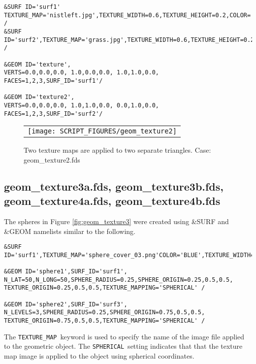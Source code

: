 \documentclass[12pt]{article}
\begin{document}
{\scriptsize
\begin{verbatim}
&SURF ID='surf1' TEXTURE_MAP='nistleft.jpg',TEXTURE_WIDTH=0.6,TEXTURE_HEIGHT=0.2,COLOR='BLUE' /
&SURF ID='surf2',TEXTURE_MAP='grass.jpg',TEXTURE_WIDTH=0.6,TEXTURE_HEIGHT=0.2,COLOR='GREEN' /

&GEOM ID='texture',
VERTS=0.0,0.0,0.0, 1.0,0.0,0.0, 1.0,1.0,0.0,
FACES=1,2,3,SURF_ID='surf1'/

&GEOM ID='texture2',
VERTS=0.0,0.0,0.0, 1.0,1.0,0.0, 0.0,1.0,0.0,
FACES=1,2,3,SURF_ID='surf2'/
\end{verbatim}
}

\begin{figure}[\figoptions]
\begin{center}
\begin{tabular}{c}
 \texttt{[image: SCRIPT\_FIGURES/geom\_texture2]}
  \end{tabular}
\end{center}
 \caption{Two texture maps are applied to two separate triangles.  Case: geom\_texture2.fds}
\label{fig:geom_texture2}
\end{figure}

\subsection{geom\_texture3a.fds, geom\_texture3b.fds, geom\_texture4a.fds, geom\_texture4b.fds}
The spheres in Figure \ref{fig:geom_texture3} were created using \&SURF and \&GEOM namelists similar to the following.

{\scriptsize
\begin{verbatim}
&SURF ID='surf1',TEXTURE_MAP='sphere_cover_03.png'COLOR='BLUE',TEXTURE_WIDTH=1.0,TEXTURE_HEIGHT=1.0/

&GEOM ID='sphere1',SURF_ID='surf1',
N_LAT=50,N_LONG=50,SPHERE_RADIUS=0.25,SPHERE_ORIGIN=0.25,0.5,0.5,
TEXTURE_ORIGIN=0.25,0.5,0.5,TEXTURE_MAPPING='SPHERICAL' /

&GEOM ID='sphere2',SURF_ID='surf3',
N_LEVELS=3,SPHERE_RADIUS=0.25,SPHERE_ORIGIN=0.75,0.5,0.5,
TEXTURE_ORIGIN=0.75,0.5,0.5,TEXTURE_MAPPING='SPHERICAL' /
\end{verbatim}
}

The {\tt TEXTURE\_MAP}\ keyword is used to specify the name of the image
file applied to the geometric object. The {\tt SPHERICAL}\ setting indicates that that the texture map image
is applied to the object using spherical coordinates.
\end{document}

